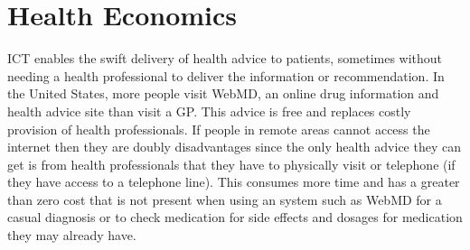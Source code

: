 \section{Health Economics}
ICT enables the swift delivery of health advice to patients, sometimes without needing a health professional to deliver the information or recommendation. In the United States, more people visit WebMD, an online drug information and health advice site than visit a GP\cite{RefWorks:365}. This advice is free and replaces costly provision of health professionals. If people in remote areas cannot access the internet then they are doubly disadvantages since the only health advice they can get is from health professionals that they have to physically visit or telephone (if they have access to a telephone line). This consumes more time and has a greater than zero cost that is not present when using an system such as WebMD for a casual diagnosis or to check medication for side effects and dosages for medication they may already have.




